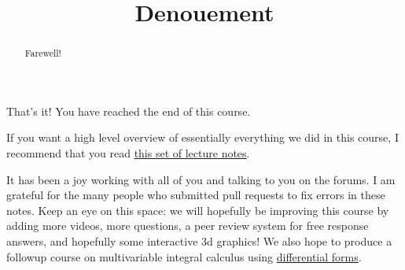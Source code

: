 \documentclass{ximera}
\title{Denouement}
\begin{document}
	\begin{abstract}
		Farewell!
	\end{abstract}\maketitle
	
	That's it!  You have reached the end of this course.
	
	If you want a high level overview of essentially everything we did in this course, I recommend that you read 
	\href{http://math.caltech.edu/~ma108a/notesderivatice.pdf}{this set of lecture notes}.
	
	It has been a joy working with all of you and talking to you on the forums.  I am grateful for the many people who submitted pull requests
	to fix errors in these notes.  Keep an eye on this space:  we will hopefully be improving this course by adding more videos, more questions, a peer review system for 
	free response answers, 
	and hopefully some interactive 3d graphics!  We also hope to produce a followup course on multivariable integral calculus using 
	\href{http://en.wikipedia.org/wiki/Differential_form}{differential forms}.
\end{document}
